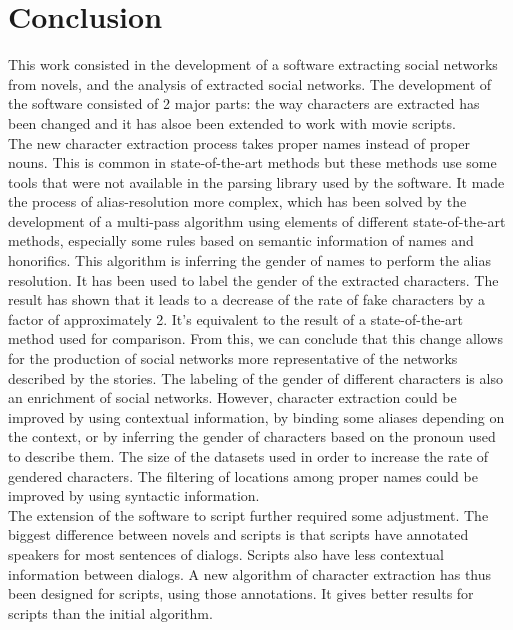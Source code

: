 \documentclass[a4paper, 12pt]{report}
\begin{document}
\chapter{Conclusion}
This work consisted in the development of a software extracting social networks from novels, and the analysis of extracted social networks.
The development of the software consisted of 2 major parts: the way characters are extracted has been changed and it has alsoe been extended to work with movie scripts.\\

The new character extraction process takes proper names instead of proper nouns. This is common in state-of-the-art methods but these methods use some tools that were not available in the parsing library used by the software. It made the process of alias-resolution more complex, which has been solved by the development of a multi-pass algorithm using elements of different state-of-the-art methods, especially some rules based on semantic information of names and honorifics. This algorithm is inferring the gender of names to perform the alias resolution. It has been used to label the gender of the extracted characters.
The result has shown that it leads to a decrease of the rate of fake characters by a factor of approximately 2.
It's equivalent to the result of a state-of-the-art method used for comparison.
From this, we can conclude that this change allows for the production of social networks more representative of the networks described by the stories.
The labeling of the gender of different characters is also an enrichment of social networks.
However, character extraction could be improved by using contextual information,
by binding some aliases depending on the context, or by inferring the gender of characters based on the pronoun used to describe them.
The size of the datasets used in order to increase the rate of gendered characters. The filtering of locations among proper names could be improved by using syntactic information.\\

The extension of the software to script further required some adjustment. The biggest difference between novels and scripts is that scripts have annotated speakers for most sentences of dialogs. Scripts also have less contextual information between dialogs.
A new algorithm of character extraction has thus been designed for scripts, using those annotations. It gives better results for scripts than the initial algorithm. \\
\end{document}
